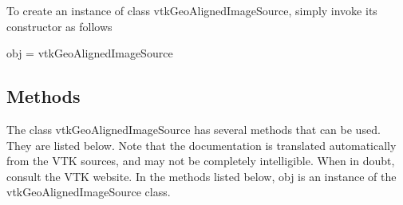To create an instance of class vtk\-Geo\-Aligned\-Image\-Source, simply invoke its constructor as follows \begin{DoxyVerb}  obj = vtkGeoAlignedImageSource
\end{DoxyVerb}
 \hypertarget{vtkwidgets_vtkxyplotwidget_Methods}{}\subsection{Methods}\label{vtkwidgets_vtkxyplotwidget_Methods}
The class vtk\-Geo\-Aligned\-Image\-Source has several methods that can be used. They are listed below. Note that the documentation is translated automatically from the V\-T\-K sources, and may not be completely intelligible. When in doubt, consult the V\-T\-K website. In the methods listed below, {\ttfamily obj} is an instance of the vtk\-Geo\-Aligned\-Image\-Source class. 
